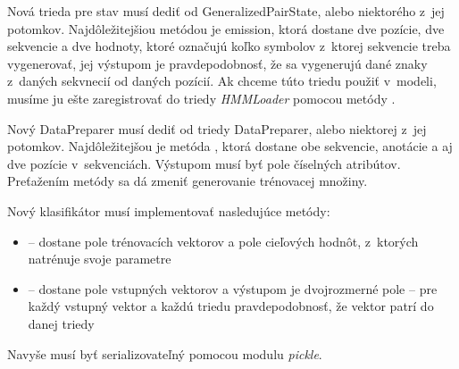 Nová trieda pre stav musí dediť od GeneralizedPairState, alebo niektorého z~jej potomkov. Najdôležitejšiou metódou je emission, ktorá dostane dve pozície, dve sekvencie a dve hodnoty, ktoré označujú koľko symbolov z~ktorej sekvencie treba vygenerovať, jej výstupom je pravdepodobnosť, že sa vygenerujú dané znaky z~daných sekvnecií od daných pozícií. Ak chceme túto triedu použiť v~modeli, musíme ju ešte zaregistrovať do triedy \textit{HMMLoader} pomocou metódy .

Nový DataPreparer musí dediť od triedy DataPreparer, alebo niektorej z~jej potomkov. Najdôležitejšou je metóda , ktorá dostane obe sekvencie, anotácie a aj dve pozície v~sekvenciách. Výstupom musí byť pole číselných atribútov. Preťažením metódy  sa dá zmeniť generovanie trénovacej množiny.

Nový klasifikátor musí implementovať nasledujúce metódy:
\begin{itemize}
    \item {} -- dostane pole trénovacích vektorov a pole cieľových hodnôt, z~ktorých natrénuje svoje parametre
    \item {} -- dostane pole vstupných vektorov a výstupom je dvojrozmerné pole -- pre každý vstupný vektor a každú triedu pravdepodobnosť, že vektor patrí do danej triedy
\end{itemize}
Navyše musí byť serializovateľný pomocou modulu \textit{pickle}.
